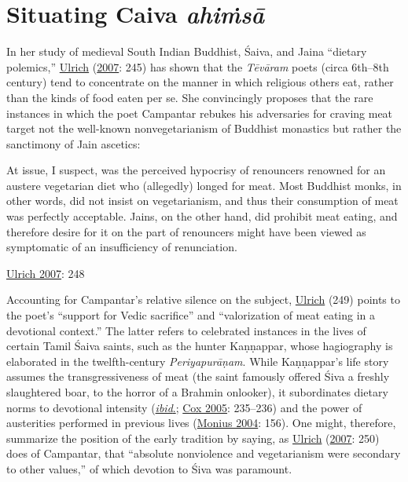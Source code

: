 \section{Situating Caiva \emph{ahiṁsā}}
      In her study of medieval South Indian Buddhist, Śaiva, and Jaina “dietary polemics,” \hyperref[Ulrich2007]{Ulrich} (\hyperref[Ulrich2007]{2007}: 245) has shown that the \emph{{Tēvāram}} poets (circa 6th–8th century) tend to concentrate on the manner in which religious others eat, rather than the kinds of food eaten per se. She convincingly proposes that the rare instances in which the poet Campantar rebukes his adversaries for craving meat target not the well-known nonvegetarianism of Buddhist monastics but rather the sanctimony of Jain ascetics:

\begin{pullquote}
At issue, I suspect, was the perceived hypocrisy of renouncers renowned for an austere vegetarian diet who (allegedly) longed for meat. Most Buddhist monks, in other words, did not insist on vegetarianism, and thus their consumption of meat was perfectly acceptable. Jains, on the other hand, did prohibit meat eating, and therefore desire for it on the part of renouncers might have been viewed as symptomatic of an insufficiency of renunciation.


\medskip\hfill\begin{minipage}{0.9\textwidth}\small\hfill
\hyperref[Ulrich2007]{Ulrich 2007}: 248\end{minipage}\hspace{2em}
\end{pullquote}

Accounting for Campantar’s relative silence on the subject, \hyperref[Ulrich2007]{Ulrich} (249) points to the poet’s “support for Vedic sacrifice” and “valorization of meat eating in a devotional context.” The latter refers to celebrated instances in the lives of certain Tamil Śaiva saints, such as the hunter Kaṇṇappar, whose hagiography is elaborated in the twelfth-century \emph{{Periyapurāṇam}}. While Kaṇṇappar’s life story assumes the transgressiveness of meat (the saint famously offered Śiva a freshly slaughtered boar, to the horror of a Brahmin onlooker), it subordinates dietary norms to devotional intensity (\hyperref[Ulrich2007]{\emph{ibid}.}; \hyperref[Cox2005]{Cox 2005}: 235–236) and the power of austerities performed in previous lives (\hyperref[Monius2004]{Monius 2004}: 156). One might, therefore, summarize the position of the early tradition by saying, as \hyperref[Ulrich2007]{Ulrich} (\hyperref[Ulrich2007]{2007}: 250) does of Campantar, that “absolute nonviolence and vegetarianism were secondary to other values,” of which devotion to Śiva was paramount.


